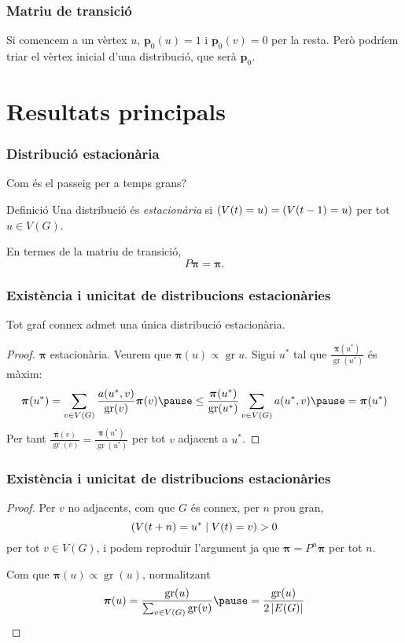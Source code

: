 \documentclass[aspectratio=169, 12pt]{beamer}
\let\P\relax
\DeclareMathOperator{\P}{P}
\renewcommand{\vec}[1]{\mathbf{\bm #1}}
\DeclareMathOperator{\gr}{gr}
\newcommand{\abs}[1]{\left\lvert #1 \right\rvert}
\begin{document}
\begin{frame}
	\frametitle{Matriu de transició}
	Si comencem a un vèrtex \( u \), \( \vec{p}_0(u) = 1 \) i \( \vec{p}_0(v) = 0 \) per la resta. \pause Però podríem triar el vèrtex inicial d'una distribució, que serà \( \vec{p}_0 \). 
\end{frame}

\section{Resultats principals}

\begin{frame}
	\frametitle{Distribució estacionària}
	Com és el passeig per a temps grans? \pause

	\begin{block}{Definició}
		Una distribució és \emph{estacionària} si \( \P(V(t) = u) = \P(V(t - 1) = u) \) per tot \( u \in V(G) \).
	\end{block} \pause

	En termes de la matriu de transició, \[ P\vec{\pi} = \vec{\pi}. \]
\end{frame}

\begin{frame}
	\frametitle{Existència i unicitat de distribucions estacionàries}
	\begin{theorem}
		Tot graf connex admet una única distribució estacionària.
	\end{theorem}
	\pause

	\begin{proof}
		\( \vec{\pi} \) estacionària. Veurem que \( \vec{\pi}(u) \propto \gr{u} \). \pause Sigui \( u^\ast \) tal que \( \frac{\vec{\pi}(u^\ast)}{\gr(u^\ast)} \) és màxim: \pause 
		\begin{equation*}
			\vec{\pi}(u^\ast) = \sum_{v \in V(G)} \frac{a(u^\ast,v)}{\gr(v)} \vec{\pi}(v) \pause \leq \frac{\vec{\pi}(u^\ast)}{\gr(u^\ast)} \sum_{v \in V(G)} a(u^{\ast},v) \pause = \vec{\pi}(u^\ast)
		\end{equation*}
		Per tant \( \frac{\vec{\pi}(v)}{\gr(v)} = \frac{\vec{\pi}(u^\ast)}{\gr(u^\ast)} \) per tot \( v \) adjacent a \( u^\ast \). 
	\end{proof}
\end{frame}

\begin{frame}
	\frametitle{Existència i unicitat de distribucions estacionàries}
	\begin{proof}
		Per \( v \) no adjacents, com que \( G \) és connex, per \( n \) prou gran, \[ \P(V(t + n) = u^\ast \mid V(t) = v) > 0 \] per tot \( v \in V(G) \), i podem reproduir l'argument ja que \( \vec{\pi} = P^n \vec{\pi} \) per tot \( n \). \pause

		Com que \( \vec{\pi}(u) \propto \gr(u) \), normalitzant
		\begin{equation*}
			\vec{\pi}(u) = \frac{\gr(u)}{\sum_{v \in V(G)} \gr(v)} \pause = \frac{\gr(u)}{2 \abs{E(G)}}
		\end{equation*}
		
	\end{proof}
\end{frame}
\end{document}

